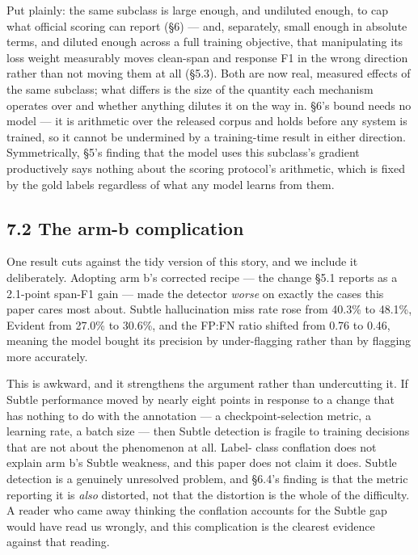 \documentclass[11pt]{article}
\begin{document}
Put plainly: the same subclass is large enough, and undiluted enough, to cap what official
scoring can report (§6) --- and, separately, small enough in absolute terms, and diluted
enough across a full training objective, that manipulating its loss weight measurably moves
clean-span and response F1 in the wrong direction rather than not moving them at all
(§5.3). Both are now real, measured effects of the same subclass; what differs is the size
of the quantity each mechanism operates over and whether anything dilutes it on the way in.
§6's bound needs no model --- it is arithmetic over the released corpus and holds before any
system is trained, so it cannot be undermined by a training-time result in either
direction. Symmetrically, §5's finding that the model uses this subclass's gradient
productively says nothing about the scoring protocol's arithmetic, which is fixed by the
gold labels regardless of what any model learns from them.

\subsection{7.2 The arm-b complication}\label{the-arm-b-complication}

One result cuts against the tidy version of this story, and we include it deliberately.
Adopting arm b's corrected recipe --- the change §5.1 reports as a 2.1-point span-F1 gain ---
made the detector \emph{worse} on exactly the cases this paper cares most about. Subtle
hallucination miss rate rose from 40.3\% to 48.1\%, Evident from 27.0\% to 30.6\%, and the
FP:FN ratio shifted from 0.76 to 0.46, meaning the model bought its precision by
under-flagging rather than by flagging more accurately.

This is awkward, and it strengthens the argument rather than undercutting it. If Subtle
performance moved by nearly eight points in response to a change that has nothing to do with
the annotation --- a checkpoint-selection metric, a learning rate, a batch size --- then Subtle
detection is fragile to training decisions that are not about the phenomenon at all. Label-
class conflation does not explain arm b's Subtle weakness, and this paper does not claim it
does. Subtle detection is a genuinely unresolved problem, and §6.4's finding is that the
metric reporting it is \emph{also} distorted, not that the distortion is the whole of the
difficulty. A reader who came away thinking the conflation accounts for the Subtle gap would
have read us wrongly, and this complication is the clearest evidence against that reading.
\end{document}
